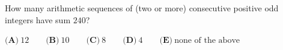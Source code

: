 How many arithmetic sequences of (two or more) consecutive positive odd integers have sum $240$?

$\textbf{(A)}\ 12\qquad\textbf{(B)}\ 10\qquad\textbf{(C)}\ 8\qquad\textbf{(D)}\ 4\qquad\textbf{(E)}\ \text{none of the above}$
